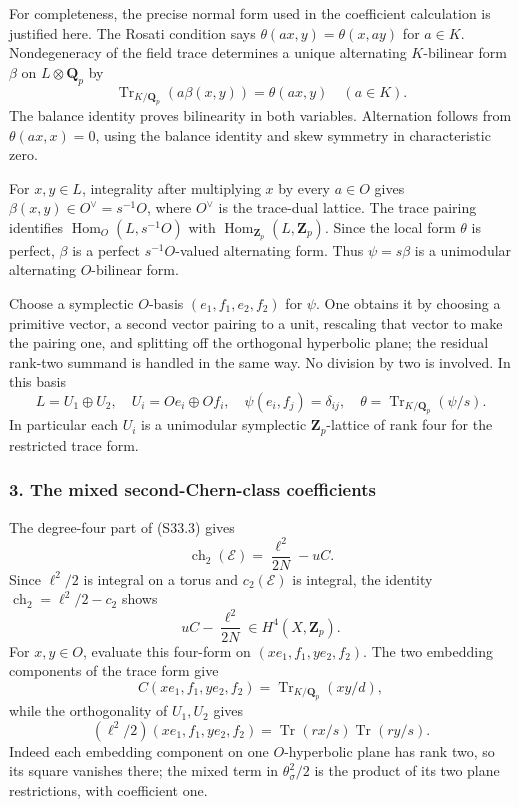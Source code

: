 For completeness, the precise normal form used in the coefficient calculation is justified here. The Rosati condition says \(\theta(ax,y)=\theta(x,ay)\) for \(a\in K\). Nondegeneracy of the field trace determines a unique alternating \(K\)-bilinear form \(\beta\) on \(L\otimes\mathbf Q_p\) by \[
 \operatorname{Tr}_{K/\mathbf Q_p}(a\beta(x,y))=\theta(ax,y)
 \quad(a\in K).
\] The balance identity proves bilinearity in both variables. Alternation follows from \(\theta(ax,x)=0\), using the balance identity and skew symmetry in characteristic zero.

For \(x,y\in L\), integrality after multiplying \(x\) by every \(a\in O\) gives \(\beta(x,y)\in O^\vee=s^{-1}O\), where \(O^\vee\) is the trace-dual lattice. The trace pairing identifies \(\operatorname{Hom}_O(L,s^{-1}O)\) with \(\operatorname{Hom}_{\mathbf Z_p}(L,\mathbf Z_p)\). Since the local form \(\theta\) is perfect, \(\beta\) is a perfect \(s^{-1}O\)-valued alternating form. Thus \(\psi=s\beta\) is a unimodular alternating \(O\)-bilinear form.

Choose a symplectic \(O\)-basis \((e_1,f_1,e_2,f_2)\) for \(\psi\). One obtains it by choosing a primitive vector, a second vector pairing to a unit, rescaling that vector to make the pairing one, and splitting off the orthogonal hyperbolic plane; the residual rank-two summand is handled in the same way. No division by two is involved. In this basis \[
 L=U_1\oplus U_2,
 \quad U_i=Oe_i\oplus Of_i,
 \quad \psi(e_i,f_j)=\delta_{ij},
 \quad \theta=\operatorname{Tr}_{K/\mathbf Q_p}(\psi/s).
 \tag{S33.6}
\] In particular each \(U_i\) is a unimodular symplectic \(\mathbf Z_p\)-lattice of rank four for the restricted trace form.

\subsubsection{3. The mixed second-Chern-class coefficients}\label{the-mixed-second-chern-class-coefficients}

The degree-four part of (S33.3) gives \[
 \operatorname{ch}_2(\mathcal E)=\frac{\ell^2}{2N}-uC.
\] Since \(\ell^2/2\) is integral on a torus and \(c_2(\mathcal E)\) is integral, the identity \(\operatorname{ch}_2=\ell^2/2-c_2\) shows \[
 uC-\frac{\ell^2}{2N}\in H^4(X,\mathbf Z_p).
 \tag{S33.7}
\] For \(x,y\in O\), evaluate this four-form on \((xe_1,f_1,ye_2,f_2)\). The two embedding components of the trace form give \[
 C(xe_1,f_1,ye_2,f_2)=\operatorname{Tr}_{K/\mathbf Q_p}(xy/d),
\] while the orthogonality of \(U_1,U_2\) gives \[
 (\ell^2/2)(xe_1,f_1,ye_2,f_2)
 =\operatorname{Tr}(rx/s)\operatorname{Tr}(ry/s).
 \tag{S33.8}
\] Indeed each embedding component on one \(O\)-hyperbolic plane has rank two, so its square vanishes there; the mixed term in \(\theta_\sigma^2/2\) is the product of its two plane restrictions, with coefficient one.

